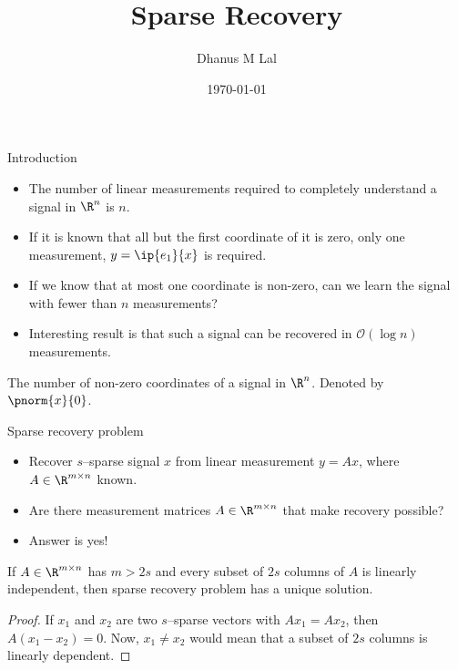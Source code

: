 \documentclass{beamer}
\title{Sparse Recovery}
\author{Dhanus M Lal}
\date{\today}
\begin{document}
\begin{frame}
	\titlepage
\end{frame}

\begin{frame}{Introduction}
	\begin{itemize}
		\item 
			The number of linear measurements required to completely
			understand a signal in $\R^n$ is $n$.
		
		\pause

		\item 
			If it is known that all but the first coordinate
			of it is zero, only one measurement, $y = \ip{e_1}{x}$ is 
			required.
	\pause	
		\item 
			If we know that at most one coordinate is non-zero,
			can we learn the signal with fewer than $n$ measurements?
		
		\pause

		\item Interesting result is that such a signal can be
			recovered in $\mathcal{O}(\log n)$ measurements.
	\end{itemize}

\pause 

	\begin{definition}[Sparsity]
		The number of non-zero coordinates of a signal in $\R^n$.
		Denoted by $\pnorm{x}{0}$.
	\end{definition}
\end{frame}


\begin{frame}{Sparse recovery problem}
	\begin{itemize}
		\item Recover $s$--sparse signal $x$ from linear measurement
			$y = Ax$, where $A\in \R^{m\times n}$ known.

			\pause

		\item Are there measurement matrices $A\in\R^{m\times n}$
			that make recovery possible?

			\pause

		\item Answer is yes!
	\end{itemize}

	\pause

	\begin{proposition}
		If $A\in \R^{m\times n}$ has $m>2s$ and every subset of $2s$
		columns of $A$ is linearly independent, then sparse recovery
		problem has a unique solution.
	\end{proposition}
\pause 

	\begin{proof}
		If $x_1$ and $x_2$ are two $s$--sparse vectors with
		$Ax_1 = Ax_2$, then $A(x_1-x_2) = 0$. Now, $x_1\neq x_2$ would
		mean that a subset of $2s$ columns is linearly dependent.
	\end{proof}
\end{frame}
\end{document}
